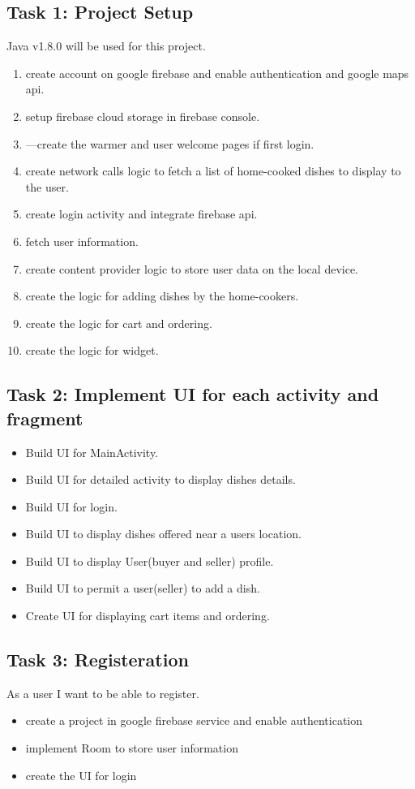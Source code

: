 \documentclass{article}
\begin{document}
\subsection{Task 1: Project Setup}
    Java v1.8.0 will be used for this project.
  \begin{enumerate}
    \item create account on google firebase and enable authentication and google maps api.
    \item setup firebase cloud storage in firebase console.
    \item---create the warmer and user welcome pages if first login.
    \item create network calls logic to fetch a list of home-cooked dishes to display to the user.
    \item create login activity and integrate firebase api.
    \item fetch user information.
    \item create content provider logic to store user data on the local device.
    \item create the logic for adding dishes by the home-cookers.
    \item create the logic for cart and ordering.
    \item create the logic for widget.
  \end{enumerate}



\subsection{Task 2: Implement UI for each activity and fragment}
  \begin{itemize}
    \item Build UI for MainActivity.
    \item Build UI for detailed activity to display dishes details.
    \item Build UI for login.
    \item Build UI to display dishes offered near a users location.
    \item Build UI to display User(buyer and seller) profile.
    \item Build UI to permit a user(seller) to add a dish.
    \item Create UI for displaying cart items and ordering.
  \end{itemize}


\subsection{Task 3: Registeration}
	As a user I want to be able to register. 
  \begin{itemize}
    \item create a project in google firebase service and enable authentication
    \item implement Room to store user information
    \item create the UI for login
  \end{itemize}
\end{document}
